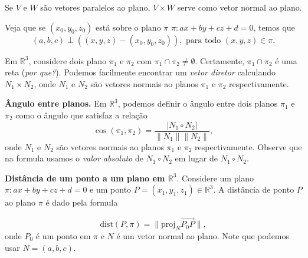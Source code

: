 \documentclass{article}
\theoremstyle{plain}
\theoremstyle{definition}
\theoremstyle{remark}
\begin{document}
 Se $V$ e $W$ são vetores paralelos ao plano, $V \times W$ serve como 
 vetor normal ao plano.
 
 Veja que se $(x_0, y_{0}, z_0)$ está sobre o plano $\pi$ 
 $\pi: ax+by+cz+d=0$, temos que 
 $$ (a,b,c) \perp ((x,y,z)-(x_0,y_0,z_0)), \text{ para todo } (x,y,z) \in \pi. $$ 

Em $\mathbb{R}^{3}$, considere dois plano $\pi_1$ e $\pi_2$ com $\pi_1 \cap \pi_2 \neq \emptyset$.
  Certamente, $\pi_1 \cap \pi_2$ é uma reta ({\it por que?}). Podemos facilmente encontrar um {\it vetor diretor} calculando 
  $N_1 \times N_2$, onde 
  $N_1$ e $N_2$ são vetores normais ao planos $\pi_1$ e $\pi_2$ respectivamente. 
  
  {\bf Ângulo entre planos. } Em $\mathbb{R}^{3}$, podemos definir o ângulo entre dois planos $\pi_1$ e $\pi_2$ 
 como o ângulo que satisfaz a relação 
  $$\cos (\pi_1,\pi_2)= \frac{|N_1 \circ N_2|}{\|N_1\|\|N_2\|}, $$
  onde  $N_1$ e $N_2$ são vetores normais ao planos $\pi_1$ e $\pi_2$ respectivamente. Observe que na formula
   usamos o {\it valor absoluto} de  $N_1 \circ N_2$ em lugar de 
   $N_1 \circ N_2$.
   
 {\bf Distância de um ponto a um plano em $\mathbb{R}^{3}$}.
 Considere um plano $\pi: ax+by+cz+d=0$ e um ponto 
 $P=(x_{1}, y_{1}, z_1) \in \mathbb{R}^{3}$. 
 A distância de ponto $P$ ao plano $\pi$ é dado pela formula
 
 \begin{equation}
 \text{dist}(P,\pi)= \|\text{proj}_{N}\overrightarrow{P_0P}\|, 
 \label{eqn:distanciapp2}
 \end{equation}
 onde $P_0$ é um ponto em $\pi$ e $N$ é um vetor normal ao plano.
 Note que podemos usar $N=(a,b,c)$.
 
\end{document}
